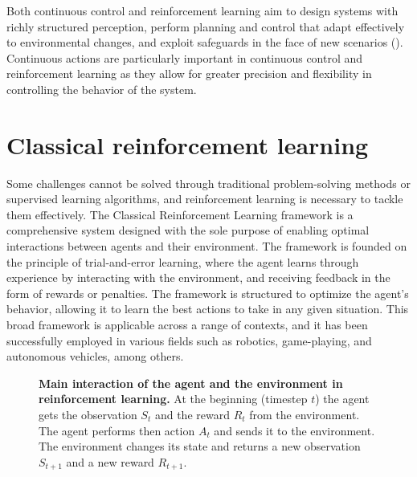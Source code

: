 Both continuous control and reinforcement learning aim to design systems with richly structured perception, perform planning and control that adapt effectively to environmental changes, and exploit safeguards in the face of new scenarios (\cite{recht_tour_2018}). Continuous actions are particularly important in continuous control and reinforcement learning as they allow for greater precision and flexibility in controlling the behavior of the system.

\section{Classical reinforcement learning}

Some challenges cannot be solved through traditional problem-solving methods or supervised learning algorithms, and reinforcement learning is necessary to tackle them effectively. 
The Classical Reinforcement Learning framework is a comprehensive system designed with the sole purpose of enabling optimal interactions between agents and their environment. The framework is founded on the principle of trial-and-error learning, where the agent learns through experience by interacting with the environment, and receiving feedback in the form of rewards or penalties. The framework is structured to optimize the agent's behavior, allowing it to learn the best actions to take in any given situation. This broad framework is applicable across a range of contexts, and it has been successfully employed in various fields such as robotics, game-playing, and autonomous vehicles, among others.

\begin{figure}[!ht]
\centering
{}
\caption[Main interaction of the agent and the environment in reinforcement learning]{
  \textbf{Main interaction of the agent and the environment in reinforcement learning.}
  At the beginning (timestep $t$) the agent gets the observation $S_t$ and the reward $R_t$ from the environment. The agent performs then action $A_t$ and sends it to the environment. The environment changes its state and returns a new observation $S_{t+1}$ and a new reward $R_{t+1}$.
 }
\label{fig:RL_main_loop}
\end{figure}


